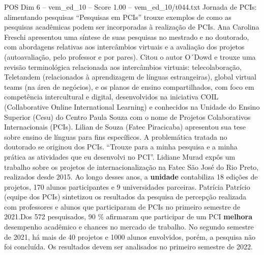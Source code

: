 \begin{textsample}{POS Dim 6 – vem\_ed\_10 – Score 1.00 – vem\_ed\_10/t044.txt}  \label{ex:f6_pos_036}
Jornada de PCIs: alimentando pesquisas “Pesquisas em PCIs” trouxe exemplos de como as pesquisas acadêmicas podem ser incorporadas à realização de PCIs.
Ana Carolina Freschi apresentou uma síntese de suas pesquisas no mestrado e no doutorado, com abordagens relativas aos intercâmbios virtuais e a avaliação dos projetos (autoavaliação, pelo professor e por pares).
Citou o autor O´Dowd e trouxe uma revisão terminológica relacionada aos intercâmbios virtuais: telecolaboração, Teletandem (relacionados à aprendizagem de línguas estrangeiras), global virtual teams (na área de negócios), e os planos de ensino compartilhados, com foco em competência intercultural e digital, desenvolvidos na iniciativa COIL (Collaborative Online International Learning) e conhecidos na Unidade do Ensino Superior (Cesu) do Centro Paula Souza com o nome de Projetos Colaborativos Internacionais (PCIs).
Lilian de Souza (Fatec Piracicaba) apresentou sua tese sobre ensino de línguas para fins específicos.
A problemática tratada no doutorado se originou dos PCIs. “Trouxe para a minha pesquisa e a minha prática as atividades que eu desenvolvi no PCI”.
Lidiane Murad expôs um trabalho sobre os projetos de internacionalização na Fatec São José do Rio Preto, realizados desde 2015.
Ao longo desses anos, a \textbf{unidade} contabiliza 18 edições de projetos, 170 alunos participantes e 9 universidades parceiras.
Patrícia Patrício (equipe dos PCIs) sintetizou os resultados da pesquisa de percepção realizada com professores e alunos que participaram de PCIs no primeiro semestre de 2021.Dos 572 pesquisados, 90 \% afirmaram que participar de um PCI \textbf{melhora} desempenho acadêmico e chances no mercado de trabalho.
No segundo semestre de 2021, há mais de 40 projetos e 1000 alunos envolvidos, porém, a pesquisa não foi concluída.
Os resultados devem ser analisados no primeiro semestre de 2022.

\end{textsample}
